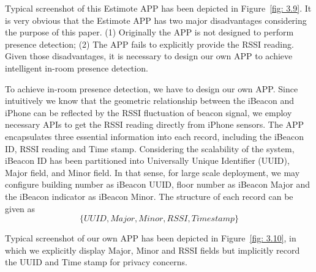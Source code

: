 \documentclass[12pt]{report}
\begin{document}
Typical screenshot of this Estimote APP has been depicted in Figure~\ref{fig: 3.9}. It is very obvious that the Estimote APP has two major disadvantages considering the purpose of this paper. (1) Originally the APP is not designed to perform presence detection; (2) The APP fails to explicitly provide the RSSI reading. Given those disadvantages, it is necessary to design our own APP to achieve intelligent in-room presence detection.

To achieve in-room presence detection, we have to design our own APP. Since intuitively we know that the geometric relationship between the iBeacon and iPhone can be reﬂected by the RSSI ﬂuctuation of beacon signal, we employ necessary APIs to get the RSSI reading directly from iPhone sensors. The APP encapsulates three essential information into each record, including the iBeacon ID, RSSI reading and Time stamp. Considering the scalability of the system, iBeacon ID has been partitioned into Universally Unique Identifier (UUID), Major field, and Minor field. In that sense, for large scale deployment, we may configure building number as iBeacon UUID, ﬂoor number as iBeacon Major and the iBeacon indicator as iBeacon Minor. The structure of each record can be given as
$$\{UUID, Major, Minor, RSSI, Time stamp\}$$

Typical screenshot of our own APP has been depicted in Figure~\ref{fig: 3.10}, in which we explicitly display Major, Minor and RSSI fields but implicitly record the UUID and Time stamp for privacy concerns.
\end{document}
